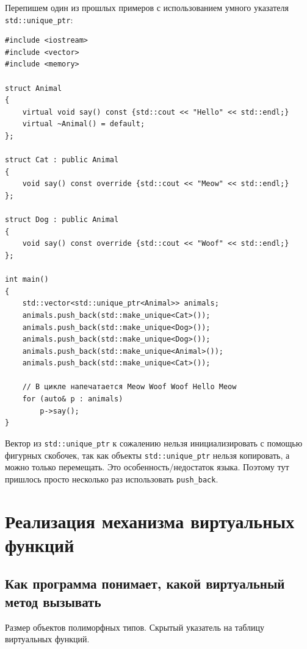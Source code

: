 \documentclass{article}
\begin{document}
Перепишем один из прошлых примеров с использованием умного указателя \texttt{std::unique\_ptr}:

\begin{lstlisting}[style=csMiptCppStyle]
#include <iostream>
#include <vector>
#include <memory>

struct Animal
{
    virtual void say() const {std::cout << "Hello" << std::endl;}
    virtual ~Animal() = default;
};

struct Cat : public Animal
{
    void say() const override {std::cout << "Meow" << std::endl;}
};

struct Dog : public Animal
{
    void say() const override {std::cout << "Woof" << std::endl;}
};

int main()
{
    std::vector<std::unique_ptr<Animal>> animals;
    animals.push_back(std::make_unique<Cat>());
    animals.push_back(std::make_unique<Dog>());
    animals.push_back(std::make_unique<Dog>());
    animals.push_back(std::make_unique<Animal>());
    animals.push_back(std::make_unique<Cat>());
    
    // В цикле напечатается Meow Woof Woof Hello Meow
    for (auto& p : animals)
        p->say();
}
\end{lstlisting}
Вектор из \texttt{std::unique\_ptr} к сожалению нельзя инициализировать с помощью фигурных скобочек, так как объекты \texttt{std::unique\_ptr} нельзя копировать, а можно только перемещать. Это особенность/недостаток языка.
Поэтому тут пришлось просто несколько раз использовать \texttt{push\_back}.

\newpage
\section{Реализация механизма виртуальных функций}
\subsection*{Как программа понимает, какой виртуальный метод вызывать}
Размер объектов полиморфных типов. Скрытый указатель на таблицу виртуальных функций.
\end{document}

